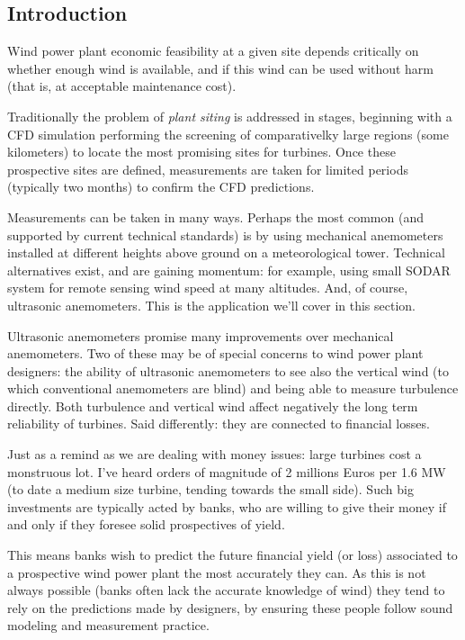 \documentclass[a4paper,10pt]{book}
\begin{document}
\subsection{Introduction}

Wind power plant economic feasibility at a given site depends critically on whether enough wind is available, and if this wind can be used without harm (that is, at acceptable maintenance cost).

Traditionally the problem of \emph{plant siting} is addressed in stages, beginning with a CFD simulation performing the screening of comparativelky large regions (some kilometers) to locate the most promising sites for turbines. Once these prospective sites are defined, measurements are taken for limited periods (typically two months) to confirm the CFD predictions.

Measurements can be taken in many ways. Perhaps the most common (and supported by current technical standards) is by using mechanical anemometers installed at different heights above ground on a meteorological tower. Technical alternatives exist, and are gaining momentum: for example, using small SODAR system for remote sensing wind speed at many altitudes. And, of course, ultrasonic anemometers. This is the application we'll cover in this section.

Ultrasonic anemometers promise many improvements over mechanical anemometers. Two of these may be of special concerns to wind power plant designers: the ability of ultrasonic anemometers to see also the vertical wind (to which conventional anemometers are blind) and being able to measure turbulence directly. Both turbulence and vertical wind affect negatively the long term reliability of turbines. Said differently: they are connected to financial losses.

Just as a remind as we are dealing with money issues: large turbines cost a monstruous lot. I've heard orders of magnitude of 2 millions Euros per 1.6 MW (to date a medium size turbine, tending towards the small side). Such big investments are typically acted by banks, who are willing to give their money if and only if they foresee solid prospectives of yield.

This means banks wish to predict the future financial yield (or loss) associated to a prospective wind power plant the most accurately they can. As this is not always possible (banks often lack the accurate knowledge of wind) they tend to rely on the predictions made by designers, by ensuring these people follow sound modeling and measurement practice.
\end{document}
